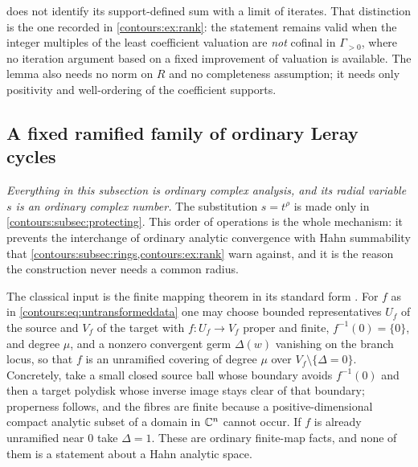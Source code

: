 \documentclass[11pt,letterpaper]{article}
\theoremstyle{definition}
\theoremstyle{remark}
\numberwithin{equation}{section}
\begin{document}
\begin{remark}
\label{contours:rem:notpicard}
 does not identify its support-defined sum
with a limit of iterates. That distinction is the one recorded in
\cref{contours:ex:rank}: the statement remains valid when the integer multiples
of the least coefficient valuation are \emph{not} cofinal in $\Gamma_{>0}$, where
no iteration argument based on a fixed improvement of valuation is available.
The lemma also needs no norm on $R$ and no completeness assumption; it needs only
positivity and well-ordering of the coefficient supports.
\end{remark}

\subsection{A fixed ramified family of ordinary Leray cycles}
\label{contours:subsec:ramified}
\emph{Everything in this subsection is ordinary complex analysis, and its radial
variable $s$ is an ordinary complex number.} The substitution
$s=t^\rho$ is made only in \cref{contours:subsec:protecting}. This order of
operations is the whole mechanism: it prevents the interchange of ordinary
analytic convergence with Hahn summability that
\cref{contours:subsec:rings,contours:ex:rank} warn against, and it is the reason
the construction never needs a common radius.

The classical input is the finite mapping theorem in its standard form
\cite[Chapters~II--III]{GrauertRemmert}. For $f$ as in
\eqref{contours:eq:untransformeddata} one may choose bounded representatives
$U_f$ of the source and $V_f$ of the target with $f:U_f\to V_f$ proper and finite,
$f^{-1}(0)=\{0\}$, and degree $\mu$, and a nonzero convergent germ $\Delta(w)$
vanishing on the branch locus, so that $f$ is an unramified covering of degree
$\mu$ over $V_f\setminus\{\Delta=0\}$. Concretely, take a small closed source ball
whose boundary avoids $f^{-1}(0)$ and then a target polydisk whose inverse image
stays clear of that boundary; properness follows, and the fibres are finite
because a positive-dimensional compact analytic subset of a domain in $\mathbb C^n$
cannot occur. If $f$ is already unramified near $0$ take $\Delta=1$. These are
ordinary finite-map facts, and none of them is a statement about a Hahn analytic
space.
\end{document}
